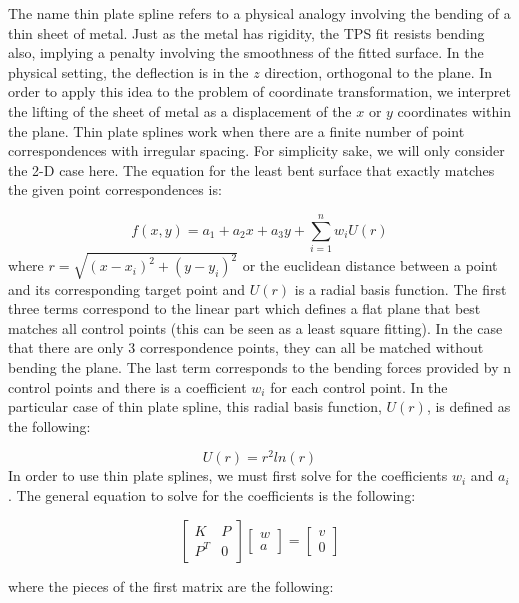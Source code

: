 The name thin plate spline refers to a physical analogy involving the bending of a thin sheet of metal. Just as the metal has rigidity, the TPS fit resists bending also, implying a penalty involving the smoothness of the fitted surface. In the physical setting, the deflection is in the $z$ direction, orthogonal to the plane. In order to apply this idea to the problem of coordinate transformation, we interpret the lifting of the sheet of metal as a displacement of the $x$ or $y$ coordinates within the plane. Thin plate splines work when there are a finite number of point correspondences with irregular spacing. For simplicity sake, we will only consider the 2-D case here. The equation for the least bent surface that exactly matches the given point correspondences is: 

\begin{equation}
f(x,y) = a_1 + a_2x + a_3y + \sum_{i=1}^{n} w_i U(r)
\label{eq:TPS}
\end{equation}
where $r = \sqrt{(x-x_i)^2 + (y-y_i)^2}$ or the euclidean distance between a point and its corresponding target point and $U(r)$ is a radial basis function. The first three terms correspond to the linear part which defines a flat plane that best matches all control points (this can be seen as a least square fitting). In the case that there are only 3 correspondence points, they can all be matched without bending the plane. The last term corresponds to the bending forces provided by n control points and there is a coefficient $w_i$ for each control point.  In the particular case of thin plate spline, this radial basis function, $U(r)$,  is defined as the following:

\begin{equation}
U(r) = r^2 ln(r)
\end{equation}
In order to use thin plate splines, we must first solve for the coefficients $w_i$ and $a_i$. The general equation to solve for the coefficients is the following:

\begin{center}
	\begin{equation}
	\begin{bmatrix}
	K   & P\\
	P^T & 0
	\end{bmatrix}
	\begin{bmatrix}
	w  \\
	a  
	\end{bmatrix}
	=
	\begin{bmatrix}
	v  \\
	0  
	\end{bmatrix}
	\end{equation}
	\label{eq:TPSLinalg}
\end{center}
where the pieces of the first matrix are the following:

